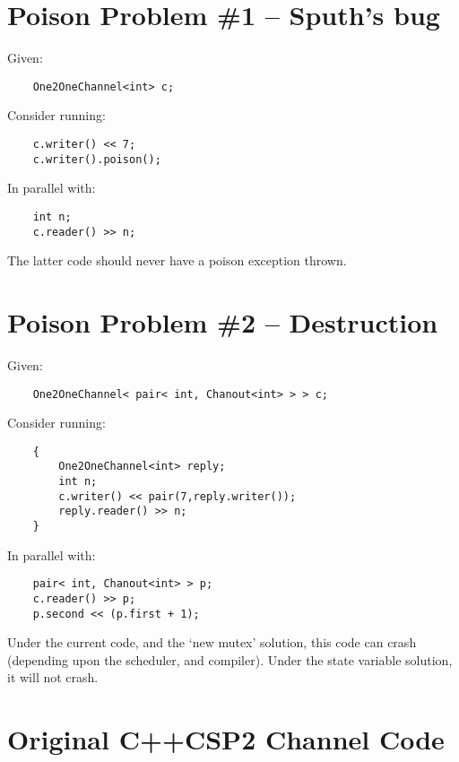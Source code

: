 \documentclass{article}
\begin{document}
\section{Poison Problem \#1 -- Sputh's bug}

Given:

{\small\begin{verbatim}
    One2OneChannel<int> c;
\end{verbatim}}

Consider running:

{\small\begin{verbatim}
    c.writer() << 7;
    c.writer().poison();
\end{verbatim}}

In parallel with:

{\small\begin{verbatim}
    int n;
    c.reader() >> n;
\end{verbatim}}

The latter code should never have a poison exception thrown.

\section{Poison Problem \#2 -- Destruction}

Given:

{\small\begin{verbatim}
    One2OneChannel< pair< int, Chanout<int> > > c;
\end{verbatim}}

Consider running:

{\small\begin{verbatim}
    {
        One2OneChannel<int> reply;
        int n;
        c.writer() << pair(7,reply.writer());
        reply.reader() >> n;
    }
\end{verbatim}}

In parallel with:

{\small\begin{verbatim}
    pair< int, Chanout<int> > p;
    c.reader() >> p;
    p.second << (p.first + 1);
\end{verbatim}}

Under the current code, and the `new mutex' solution, this code can crash (depending upon the scheduler, and compiler).  Under the state variable
solution, it will not crash.


\section{Original C++CSP2 Channel Code}
\end{document}
